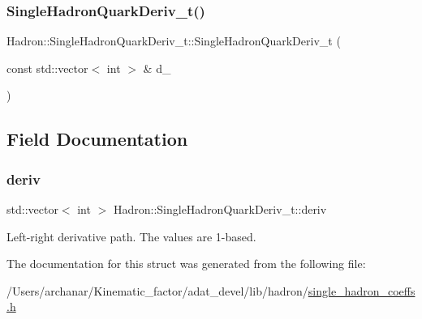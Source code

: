 \mbox{\label{structHadron_1_1SingleHadronQuarkDeriv__t_aa7239c485a6348276814f945fe15139c}} 
\subsubsection{\texorpdfstring{SingleHadronQuarkDeriv\_t()}{SingleHadronQuarkDeriv\_t()}\hspace{0.1cm}{\footnotesize\ttfamily [4/4]}}
{\footnotesize\ttfamily Hadron\+::\+Single\+Hadron\+Quark\+Deriv\+\_\+t\+::\+Single\+Hadron\+Quark\+Deriv\+\_\+t (\begin{DoxyParamCaption}\item[{const std\+::vector$<$ int $>$ \&}]{d\+\_\+ }\end{DoxyParamCaption})\hspace{0.3cm}{\ttfamily [inline]}}



\subsection{Field Documentation}
\mbox{\label{structHadron_1_1SingleHadronQuarkDeriv__t_a20101dafcfaf3f8294f11c87ec3445c6}} 
\subsubsection{\texorpdfstring{deriv}{deriv}}
{\footnotesize\ttfamily std\+::vector$<$ int $>$ Hadron\+::\+Single\+Hadron\+Quark\+Deriv\+\_\+t\+::deriv}

Left-\/right derivative path. The values are 1-\/based. 

The documentation for this struct was generated from the following file\+:\begin{DoxyCompactItemize}
\item 
/\+Users/archanar/\+Kinematic\+\_\+factor/adat\+\_\+devel/lib/hadron/\mbox{\hyperlink{lib_2hadron_2single__hadron__coeffs_8h}{single\+\_\+hadron\+\_\+coeffs.\+h}}\end{DoxyCompactItemize}
